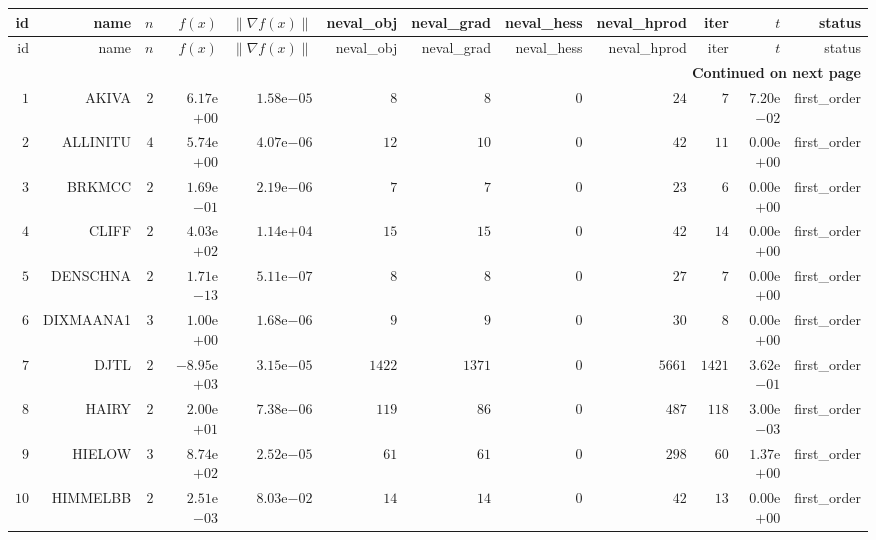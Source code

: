 \begin{longtable}{rrrrrrrrrrrr}
  \hline
  id & name & \(n\) & \(f(x)\) & \(\|\nabla f(x)\|\) & neval\_obj & neval\_grad & neval\_hess & neval\_hprod & iter & \(t\) & status \\\hline
  \endfirsthead
  \hline
  id & name & \(n\) & \(f(x)\) & \(\|\nabla f(x)\|\) & neval\_obj & neval\_grad & neval\_hess & neval\_hprod & iter & \(t\) & status \\\hline
  \endhead
  \hline
  \multicolumn{12}{r}{{\bfseries Continued on next page}}\\
  \hline
  \endfoot
  \endlastfoot
  \(     1\) & AKIVA & \(     2\) & \( 6.17\)e\(+00\) & \( 1.58\)e\(-05\) & \(     8\) & \(     8\) & \(     0\) & \(    24\) & \(     7\) & \( 7.20\)e\(-02\) & first\_order \\
  \(     2\) & ALLINITU & \(     4\) & \( 5.74\)e\(+00\) & \( 4.07\)e\(-06\) & \(    12\) & \(    10\) & \(     0\) & \(    42\) & \(    11\) & \( 0.00\)e\(+00\) & first\_order \\
  \(     3\) & BRKMCC & \(     2\) & \( 1.69\)e\(-01\) & \( 2.19\)e\(-06\) & \(     7\) & \(     7\) & \(     0\) & \(    23\) & \(     6\) & \( 0.00\)e\(+00\) & first\_order \\
  \(     4\) & CLIFF & \(     2\) & \( 4.03\)e\(+02\) & \( 1.14\)e\(+04\) & \(    15\) & \(    15\) & \(     0\) & \(    42\) & \(    14\) & \( 0.00\)e\(+00\) & first\_order \\
  \(     5\) & DENSCHNA & \(     2\) & \( 1.71\)e\(-13\) & \( 5.11\)e\(-07\) & \(     8\) & \(     8\) & \(     0\) & \(    27\) & \(     7\) & \( 0.00\)e\(+00\) & first\_order \\
  \(     6\) & DIXMAANA1 & \(     3\) & \( 1.00\)e\(+00\) & \( 1.68\)e\(-06\) & \(     9\) & \(     9\) & \(     0\) & \(    30\) & \(     8\) & \( 0.00\)e\(+00\) & first\_order \\
  \(     7\) & DJTL & \(     2\) & \(-8.95\)e\(+03\) & \( 3.15\)e\(-05\) & \(  1422\) & \(  1371\) & \(     0\) & \(  5661\) & \(  1421\) & \( 3.62\)e\(-01\) & first\_order \\
  \(     8\) & HAIRY & \(     2\) & \( 2.00\)e\(+01\) & \( 7.38\)e\(-06\) & \(   119\) & \(    86\) & \(     0\) & \(   487\) & \(   118\) & \( 3.00\)e\(-03\) & first\_order \\
  \(     9\) & HIELOW & \(     3\) & \( 8.74\)e\(+02\) & \( 2.52\)e\(-05\) & \(    61\) & \(    61\) & \(     0\) & \(   298\) & \(    60\) & \( 1.37\)e\(+00\) & first\_order \\
  \(    10\) & HIMMELBB & \(     2\) & \( 2.51\)e\(-03\) & \( 8.03\)e\(-02\) & \(    14\) & \(    14\) & \(     0\) & \(    42\) & \(    13\) & \( 0.00\)e\(+00\) & first\_order \\

\end{longtable}
